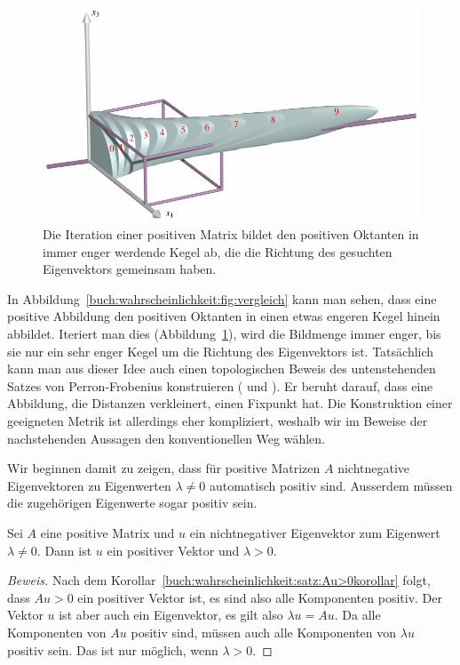 \begin{figure}
\centering
\includegraphics{chapters/80-wahrscheinlichkeit/images/positiv.pdf}
\caption{Die Iteration einer positiven Matrix bildet den positiven Oktanten
in immer enger werdende Kegel ab, die die Richtung des gesuchten Eigenvektors
gemeinsam haben.
\label{buch:wahrscheinlichkeit:figure:positiv}}
\end{figure}

In Abbildung~\ref{buch:wahrscheinlichkeit:fig:vergleich} kann man sehen,
dass eine positive Abbildung den positiven Oktanten in einen etwas engeren
Kegel hinein abbildet.
Iteriert man dies (Abbildung~\ref{buch:wahrscheinlichkeit:figure:positiv}),
wird die Bildmenge immer enger, bis sie nur ein
sehr enger Kegel um die Richtung des Eigenvektors ist.
Tatsächlich kann man aus dieser Idee auch einen topologischen
Beweis des untenstehenden Satzes von Perron-Frobenius konstruieren
(\cite{skript:pftopo} und
\cite{skript:hilbertmetric}).
Er beruht darauf, dass eine Abbildung, die Distanzen verkleinert,
einen Fixpunkt hat.
Die Konstruktion einer geeigneten Metrik ist allerdings eher 
kompliziert, weshalb wir im Beweise der nachstehenden Aussagen
den konventionellen Weg wählen.

Wir beginnen damit zu zeigen, dass für positive Matrizen $A$
nichtnegative Eigenvektoren zu Eigenwerten $\lambda\ne 0$
automatisch positiv sind.
Ausserdem müssen die zugehörigen Eigenwerte sogar positiv sein.

\begin{satz}
Sei $A$ eine positive Matrix und $u$ ein nichtnegativer Eigenvektor zum
Eigenwert $\lambda\ne 0$.
Dann ist $u$ ein positiver Vektor und $\lambda > 0$.
\end{satz}

\begin{proof}[Beweis]
Nach dem Korollar~\ref{buch:wahrscheinlichkeit:satz:Au>0korollar}
folgt, dass $Au>0$ ein positiver Vektor ist, es sind
also alle Komponenten positiv.
Der Vektor $u$ ist aber auch ein Eigenvektor, es gilt also
$\lambda u = Au$.
Da alle Komponenten von $Au$ positiv sind, müssen auch
alle Komponenten von $\lambda u$ positiv sein.
Das ist nur möglich, wenn $\lambda > 0$.
\end{proof}

